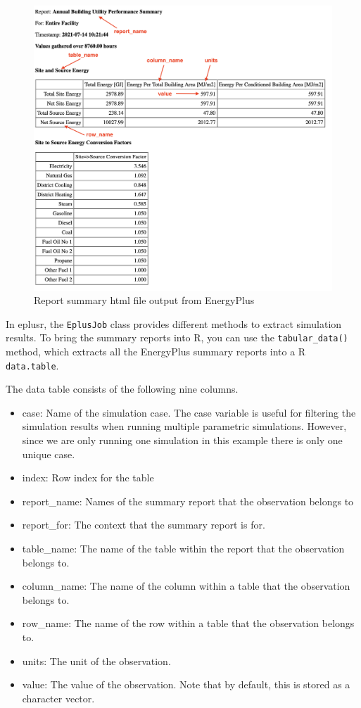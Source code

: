 \documentclass[
]{book}
\providecommand{\tightlist}{%
  \setlength{\itemsep}{0pt}\setlength{\parskip}{0pt}}
\begin{document}
\begin{figure}

{\centering \includegraphics[width=0.8\linewidth]{figures/tabular_data} 

}

\caption{Report summary html file output from EnergyPlus}\label{fig:tabular-data}
\end{figure}

In eplusr, the \texttt{EplusJob} class provides different methods to extract simulation results. To bring the summary reports into R, you can use the \texttt{tabular\_data()} method, which extracts all the EnergyPlus summary reports into a R \texttt{data.table}.

The data table consists of the following nine columns.

\begin{itemize}
\tightlist
\item
  case: Name of the simulation case. The case variable is useful for filtering the simulation results when running multiple parametric simulations. However, since we are only running one simulation in this example there is only one unique case.
\item
  index: Row index for the table
\item
  report\_name: Names of the summary report that the observation belongs to
\item
  report\_for: The context that the summary report is for.
\item
  table\_name: The name of the table within the report that the observation belongs to.
\item
  column\_name: The name of the column within a table that the observation belongs to.
\item
  row\_name: The name of the row within a table that the observation belongs to.
\item
  units: The unit of the observation.
\item
  value: The value of the observation. Note that by default, this is stored as a character vector.
\end{itemize}
\end{document}
